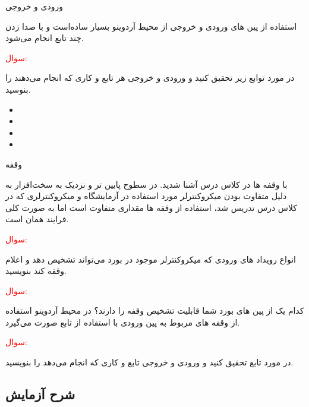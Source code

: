 \begin{nas}ورودی و خروجی\end{nas}
\newline
استفاده از پین های ورودی و خروجی از محیط آردوینو بسیار ساده‌است و با صدا زدن چند تابع انجام می‌شود.
\newline
\textcolor{red}{\begin{nas}سوال: \end{nas}}
در مورد توابع زیر تحقیق کنید و ورودی و خروجی هر تابع و کاری که انجام می‌دهند را بنوسید.
\begin{itemize}
    \item {}
    \item {}
    \item {}
    \item {}
\end{itemize}




\begin{nas}وقفه\end{nas}
\newline
با وقفه ها در کلاس درس آشنا شدید. در سطوح پایین تر و نزدیک به سخت‌افزار به دلیل متفاوت بودن میکروکنترلر مورد استفاده در آزمایشگاه و میکروکنترلری که در کلاس درس تدریس شد، استفاده از وقفه ها مقداری متفاوت است اما به صورت کلی فرایند همان است.
\newline
\textcolor{red}{\begin{nas}سوال: \end{nas}}
انواع رویداد های ورودی که میکروکنترلر موجود در بورد  می‌تواند تشخیص دهد و اعلام وقفه کند بنویسید.
\newline
\textcolor{red}{\begin{nas}سوال: \end{nas}}
کدام یک از پین های بورد شما قابلیت تشخیص وقفه را دارند؟
\newline
در محیط آردوینو استفاده از وقفه های مربوط به پین ورودی با استفاده از تابع  صورت می‌گیرد.
\newline
\textcolor{red}{\begin{nas}سوال: \end{nas}}
در مورد تابع  تحقیق کنید و ورودی و خروجی تابع و کاری که انجام می‌دهد را بنویسید.

\subsection{شرح آزمایش}

